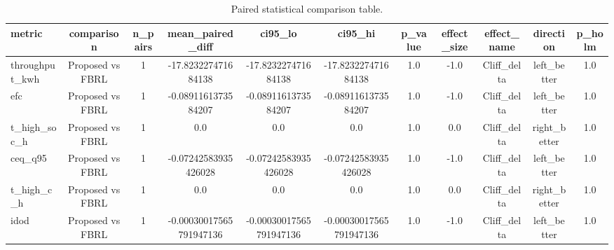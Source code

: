 \begin{table}[t]
\centering
\caption{Paired statistical comparison table.}
\label{tab:stats_auto}
\begin{tabular}{lcccccccccc}
\toprule
metric & comparison & n\_pairs & mean\_paired\_diff & ci95\_lo & ci95\_hi & p\_value & effect\_size & effect\_name & direction & p\_holm \\
\midrule
throughput\_kwh & Proposed vs FBRL & 1 & -17.823227471684138 & -17.823227471684138 & -17.823227471684138 & 1.0 & -1.0 & Cliff\_delta & left\_better & 1.0 \\
efc & Proposed vs FBRL & 1 & -0.0891161373584207 & -0.0891161373584207 & -0.0891161373584207 & 1.0 & -1.0 & Cliff\_delta & left\_better & 1.0 \\
t\_high\_soc\_h & Proposed vs FBRL & 1 & 0.0 & 0.0 & 0.0 & 1.0 & 0.0 & Cliff\_delta & right\_better & 1.0 \\
ceq\_q95 & Proposed vs FBRL & 1 & -0.07242583935426028 & -0.07242583935426028 & -0.07242583935426028 & 1.0 & -1.0 & Cliff\_delta & left\_better & 1.0 \\
t\_high\_c\_h & Proposed vs FBRL & 1 & 0.0 & 0.0 & 0.0 & 1.0 & 0.0 & Cliff\_delta & right\_better & 1.0 \\
idod & Proposed vs FBRL & 1 & -0.00030017565791947136 & -0.00030017565791947136 & -0.00030017565791947136 & 1.0 & -1.0 & Cliff\_delta & left\_better & 1.0 \\
\bottomrule
\end{tabular}
\end{table}